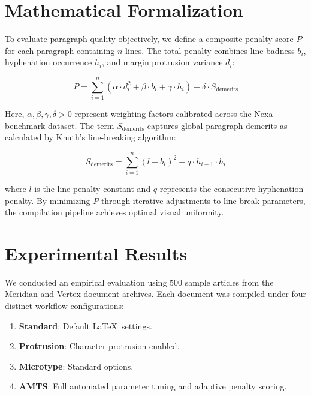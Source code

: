 \documentclass{ltugboat}
\begin{document}
\section{Mathematical Formalization}

To evaluate paragraph quality objectively, we define a composite penalty score $P$ for each paragraph containing $n$ lines. The total penalty combines line badness $b_i$, hyphenation occurrence $h_i$, and margin protrusion variance $d_i$:

\begin{equation}
P = \sum_{i=1}^{n} \left( \alpha \cdot d_i^2 + \beta \cdot b_i + \gamma \cdot h_i \right) + \delta \cdot S_{\text{demerits}}
\label{eq:penalty}
\end{equation}

Here, $\alpha, \beta, \gamma, \delta > 0$ represent weighting factors calibrated across the Nexa benchmark dataset. The term $S_{\text{demerits}}$ captures global paragraph demerits as calculated by Knuth's line-breaking algorithm:

\begin{equation}
S_{\text{demerits}} = \sum_{i=1}^{n} \left( l + b_i \right)^2 + q \cdot h_{i-1} \cdot h_i
\label{eq:demerits}
\end{equation}

where $l$ is the line penalty constant and $q$ represents the consecutive hyphenation penalty. By minimizing $P$ through iterative adjustments to line-break parameters, the compilation pipeline achieves optimal visual uniformity.

\section{Experimental Results}

We conducted an empirical evaluation using $500$ sample articles from the Meridian and Vertex document archives. Each document was compiled under four distinct workflow configurations:
\begin{enumerate}
\item \textbf{Standard}: Default \LaTeX\ settings.
\item \textbf{Protrusion}: Character protrusion enabled.
\item \textbf{Microtype}: Standard  options.
\item \textbf{AMTS}: Full automated parameter tuning and adaptive penalty scoring.
\end{enumerate}
\end{document}
